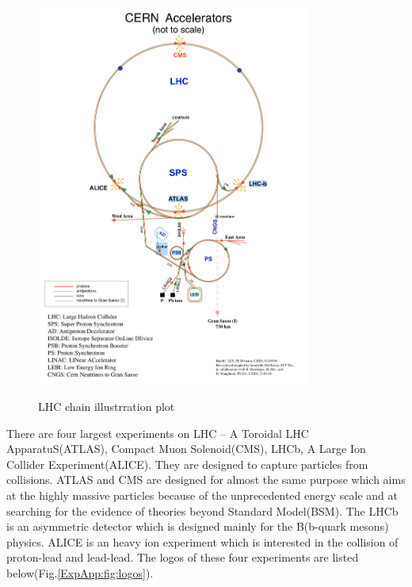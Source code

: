 		\begin{figure}[H]
		\centering{}
	    	\includegraphics[width=0.8\textwidth]{Figures/ExpApparatus/LHC_chain2.png}\\
		\caption{LHC chain illustrration plot\cite{Halkiadakis:2010mj}}
		\label{ExpApp:fig:LHC_chain}
		\end{figure}
		\FloatBarrier

		There are four largest experiments on LHC -- A Toroidal LHC ApparatuS(ATLAS), Compact Muon Solenoid(CMS), LHCb, A Large Ion Collider Experiment(ALICE). They are designed to capture particles from collisions. ATLAS and CMS are designed for almost the same purpose which aims at the highly massive particles because of the unprecedented energy scale and at searching for the evidence of theories beyond Standard Model(BSM). The LHCb is an asymmetric detector which is designed mainly for the B(b-quark mesons) physics. ALICE is an heavy ion experiment which is interested in the collision of proton-lead and lead-lead. The logos of these four experiments are listed below(Fig.\ref{ExpApp:fig:logos}).
		

